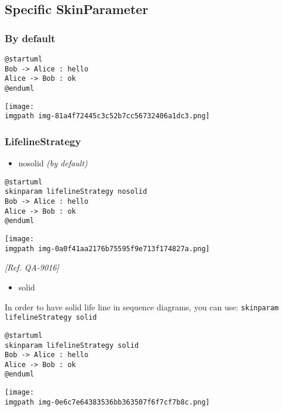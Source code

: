\subsection{Specific SkinParameter}


\subsubsection{By default}
\begin{verbatim}
@startuml
Bob -> Alice : hello
Alice -> Bob : ok
@enduml
\end{verbatim}
\begin{center}
\texttt{[image: \\imgpath img-81a4f72445c3c52b7cc56732406a1dc3.png]}
\end{center}


\subsubsection{LifelineStrategy }


\begin{itemize}
\item nosolid \textit{(by default)}
\end{itemize}
\begin{verbatim}
@startuml
skinparam lifelineStrategy nosolid
Bob -> Alice : hello
Alice -> Bob : ok
@enduml
\end{verbatim}
\begin{center}
\texttt{[image: \\imgpath img-0a0f41aa2176b75595f9e713f174827a.png]}
\end{center}
\textit{[Ref. QA-9016]}


\begin{itemize}
\item solid
\end{itemize}
In order to have solid life line in sequence diagrams, you can use: \texttt{skinparam lifelineStrategy solid}
\begin{verbatim}
@startuml
skinparam lifelineStrategy solid
Bob -> Alice : hello
Alice -> Bob : ok
@enduml
\end{verbatim}
\begin{center}
\texttt{[image: \\imgpath img-0e6c7e64383536bb363507f6f7cf7b8c.png]}
\end{center}


